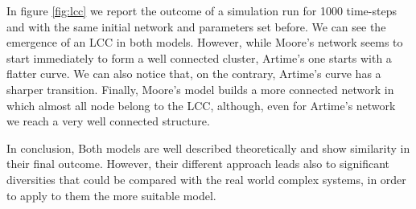 In figure \ref{fig:lcc} we report the outcome of a simulation run for 1000 time-steps and with the same initial network and parameters set before. We can see the emergence of an LCC in both models. However, while Moore's network seems to start immediately to form a well connected cluster, Artime's one starts with a flatter curve. We can also notice that, on the contrary, Artime's curve has a sharper transition. Finally, Moore's model builds a more connected network in which almost all node belong to the LCC, although, even for Artime's network we reach a very well connected structure. 

In conclusion, Both models are well described theoretically and show similarity in their final outcome. However, their different approach leads also to significant diversities that could be compared with the real world complex systems, in order to apply to them the more suitable model.

\newpage
